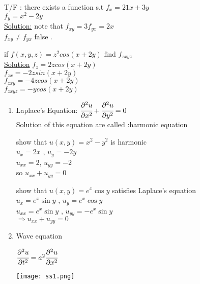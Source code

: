  \begin{example}
 T/F : there exists a function s.t 
 $f_x = 21x + 3y $\\
 $f_y = x^{2} - 2y$\\
 \underline{\textbf{\large}\color{smalt(darkpowderblue)}Solution:} note that 
 $f_{xy} = 3   f_{yx} = 2x $\\
 $f_{xy} \neq f_{yx} $ false .
 \end{example}
 \noindent{\color{smalt(darkpowderblue)}\rule{\linewidth}{.2mm}}

\begin{example}
if $f(x,y,z) = z^{2} cos(x+2y) $ find $f_{zxyz}$\\
\underline{\textbf{\large}\color{smalt(darkpowderblue)}Solution}
$f_z = 2z cos(x+2y)$\\
 $f_{zx} = -2z sin (x+2y)$\\
 $f_{zxy} = -4z cos(x+2y)$\\
 $f_{zxyz} = -ycos(x+2y)$
 \end{example}
 \noindent{\color{smalt(darkpowderblue)}\rule{\linewidth}{.2mm}}
{\color{smalt(darkpowderblue)}{Partial differential Equation:}}
\begin{enumerate}
    \item Laplace's Equation:
    $\cfrac{\partial^2 u}{\partial x^2}+\cfrac{\partial^2 u}{\partial y^2}=0$\\
    Solution of this equation are called :{\color{smalt(darkpowderblue)}harmonic equation}\\

    \begin{example}
    show that $u(x,y)=x^2-y^2$ is harmonic \\
    $u_x=2x$ , $u_y=-2y$\\
    $u_{xx}=2$, $u_{yy}=-2$\\
    so $u_{xx}+u_{yy}=0$
    \end{example}
    \noindent{\color{smalt(darkpowderblue)}\rule{\linewidth}{.2mm}}

    \begin{example}
    show that $u(x,y)=e^x\cos{y}$ satisfies Laplace's equation \\
    $u_x=e^x\sin{y}$ , $u_y=e^x\cos{y}$\\
    $u_{xx}=e^x\sin{y}$ , $u_{yy}=-e^x\sin{y}$\\
    $\Rightarrow u_{xx}+u_{yy}=0$
    \end{example}
    \noindent{\color{smalt(darkpowderblue)}\rule{\linewidth}{.2mm}}

    \item Wave equation \\
       \noindent\begin{minipage}{0.5\textwidth}
    $\cfrac{\partial^2 u}{\partial t^2}=a^2\cfrac{\partial^2 u}{\partial x^2}$\\
\end{minipage}
    \noindent\begin{minipage}{0.5\textwidth}
\begin{center}
   \texttt{[image: ss1.png]}\\
\end{center}\end{minipage}
\end{enumerate}
